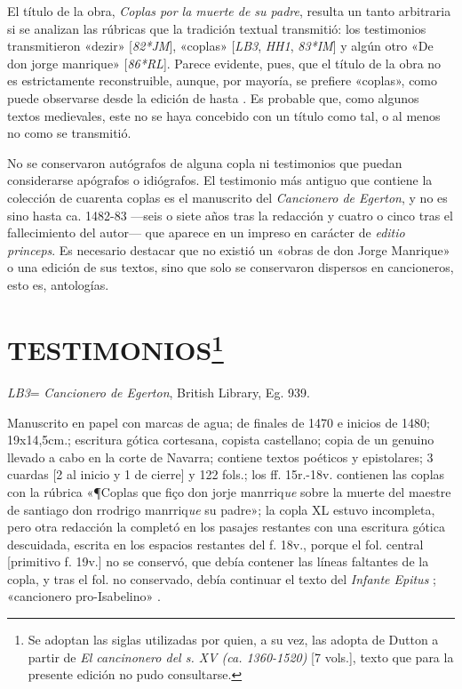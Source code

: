 \documentclass[11pt,a4paper,twoside]{article}
\newcommand{\comillas}[1]{«#1»}
\begin{document}
El título de la obra, \textit{Coplas por la muerte de su padre}, resulta un tanto arbitraria si se analizan las rúbricas que la tradición textual transmitió: los testimonios transmitieron \comillas{dezir} [\textit{82*JM}], \comillas{coplas} [\textit{LB3}, \textit{HH1}, \textit{83*IM}] y algún otro \comillas{De don jorge manrique} [\textit{86*RL}]. Parece evidente, pues, que el título de la obra no es estrictamente reconstruible, aunque, por mayoría, se prefiere \comillas{coplas}, como puede observarse desde la edición de \textcite{Foulché-Delbosc1902} hasta \textcite{Beltrán2013}. Es probable que, como algunos textos medievales, este no se haya concebido con un título como tal, o al menos no como se transmitió.

No se conservaron autógrafos de alguna copla ni testimonios que puedan considerarse apógrafos o idiógrafos. El testimonio más antiguo que contiene la colección de cuarenta coplas es el manuscrito del \textit{Cancionero de Egerton}, y no es sino hasta ca. 1482-83 —seis o siete años tras la redacción y cuatro o cinco tras el fallecimiento del autor— que aparece en un impreso en carácter de \textit{editio princeps}. Es necesario destacar que no existió un \comillas{obras de don Jorge Manrique} o una edición de sus textos, sino que solo se conservaron dispersos en cancioneros, esto es, antologías.

\section*{\fontsize{14}{14.35}\selectfont TESTIMONIOS\footnote{Se adoptan las siglas utilizadas por \textcite{PérezPriego2017} quien, a su vez, las adopta de Dutton a partir de \textit{El cancinonero del s. XV (ca. 1360-1520)} [7 vols.], texto que para la presente edición no pudo consultarse.}}

\textit{LB3}= \textit{Cancionero de Egerton}, British Library, Eg. 939.

Manuscrito en papel con marcas de agua; de finales de 1470 e inicios de 1480; 19x14,5cm.; escritura gótica cortesana, copista castellano; copia de un genuino llevado a cabo en la corte de Navarra; contiene textos poéticos y epistolares; 3 cuardas [2 al inicio y 1 de cierre] y 122 fols.; los ff. 15r.-18v. contienen las coplas con la rúbrica \comillas{¶Coplas que fiço don jorje manrriq\textit{ue} sobre la muerte del maestre de santiago don rrodrigo manrriq\textit{ue} su padre}; la copla XL estuvo incompleta, pero otra redacción la completó en los pasajes restantes con una escritura gótica descuidada, escrita en los espacios restantes del f. 18v., porque el fol. central [primitivo f. 19v.] no se conservó, que debía contener las líneas faltantes de la copla, y tras el fol. no conservado, debía continuar el texto del \textit{Infante Epitus} \textcite{Beltrán2011}; \comillas{cancionero pro-Isabelino} \parencite{Severin2000}.\vspace{5pt}
\end{document}
